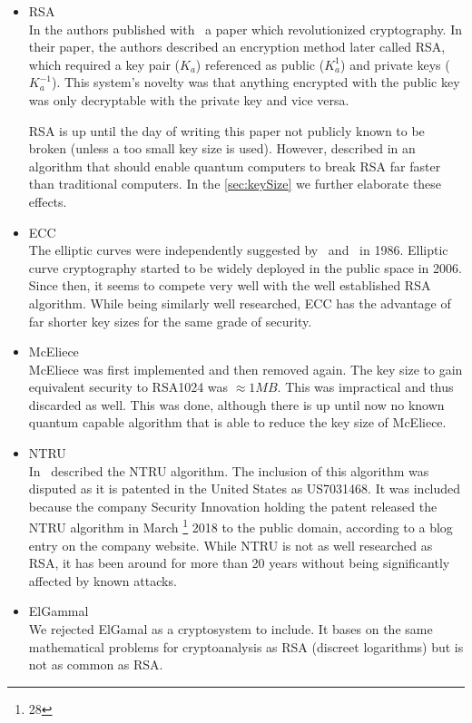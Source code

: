 \begin{itemize}
	\item RSA\\
	In \citeyear{Rivest:1978:MOD:359340.359342} the authors \citeauthor{Rivest:1978:MOD:359340.359342} published with~\cite{Rivest:1978:MOD:359340.359342} a paper which revolutionized cryptography. In their paper, the authors described an encryption method later called RSA, which required a key pair ($K_a$) referenced as public ($K^{1}_a$) and private keys ($K^{-1}_a$). This system's novelty was that anything encrypted with the public key was only decryptable with the private key and vice versa.
	
	RSA is up until the day of writing this paper not publicly known to be broken (unless a too small key size is used). However, \citeauthor{Shor97polynomial-timealgorithms} described in \citeyear{Shor97polynomial-timealgorithms} an algorithm that should enable quantum computers to break RSA far faster than traditional computers. In the \cref{sec:keySize} we further elaborate these effects.
	\item ECC\\
	The elliptic curves were independently suggested by~\cite{Miller1986} and~\cite{Koblitz04guideto} in 1986. Elliptic curve cryptography started to be widely deployed in the public space in 2006. Since then, it seems to compete very well with the well established RSA algorithm. While being similarly well researched, ECC has the advantage of far shorter key sizes for the same grade of security.
	\item McEliece\\
	McEliece was first implemented and then removed again. The key size to gain equivalent security to RSA1024 was $\approx 1MB$. This was impractical and thus discarded as well. This was done, although there is up until now no known quantum capable algorithm that is able to reduce the key size of McEliece.
	\item NTRU\\
	In~\cite{Hoffstein1998} \citeauthor{Hoffstein1998} described the NTRU algorithm. The inclusion of this algorithm was disputed as it is patented in the United States as US7031468. It was included because the company Security Innovation holding the patent released the NTRU algorithm in March \thanks{28} 2018 to the public domain, according to a blog entry on the company website. While NTRU is not as well researched as RSA, it has been around for more than 20 years without being significantly affected by known attacks.
	\item ElGammal\\
	We rejected ElGamal as a cryptosystem to include. It bases on the same mathematical problems for cryptoanalysis as RSA (discreet logarithms) but is not as common as RSA.
\end{itemize}


